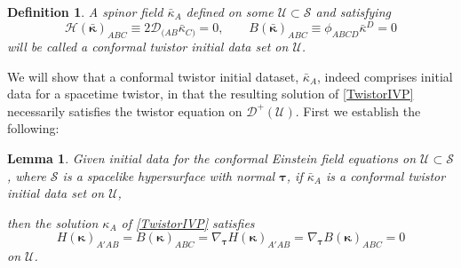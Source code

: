\documentclass[10pt,a4paper]{article}
\theoremstyle{plain}
\newtheorem{lemma}{Lemma}
\newtheorem*{definition}{Definition}
\begin{document}
\begin{definition}{\em
A spinor field $\bar{\kappa}_A$ defined on some
$\mathcal{U}\subset\mathcal{S}$ and satisfying
\begin{equation}
    \mathcal{H}(\bar{\bm\kappa})_{ABC}\equiv
    2\mathcal{D}_{(AB}\bar{\kappa}_{C)}=0,\qquad
    B(\bar{\bm\kappa})_{ABC}\equiv
    \phi_{ABCD}\bar{\kappa}^D=0 \label{twistor_CSKIDs}
\end{equation}
will be called a \emph{conformal twistor initial data set} on
$\mathcal{U}$.}
\end{definition}
We will show that a conformal twistor initial dataset,
$\bar{\kappa}_A$, indeed comprises initial data for a spacetime
twistor, in that the resulting solution of \eqref{TwistorIVP}
necessarily satisfies the twistor equation on
$\mathcal{D}^+(\mathcal{U})$. First we establish the following:
\begin{lemma}\label{lemma:twistor_removing_redundancy}
  Given initial data for the conformal Einstein field equations on
  $\mathcal{U}\subset\mathcal{S}$, where $\mathcal{S}$ is a spacelike
  hypersurface with normal $\bm\tau$, if $\bar{\kappa}_A$ is a
  conformal twistor initial data set on $\mathcal{U}$,

then the solution $\kappa_A$ of \eqref{TwistorIVP} satisfies
\[H(\bm\kappa)_{A'AB}=B(\bm\kappa)_{ABC}=\nabla_{\bm\tau}H(\bm\kappa)_{A'AB}=\nabla_{\bm\tau}B(\bm\kappa)_{ABC}=0 \]
on $\mathcal{U}$.
\end{lemma}
\end{document}
